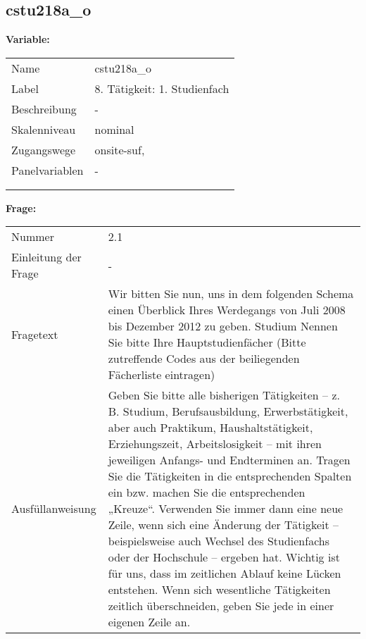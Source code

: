 	
	
	\subsection{cstu218a\_o}
	\label{subSection:cstu218a_o}

	\noindent\textbf{Variable:}\\
		\begin{tabular}{lL{11.3cm}}
			\label{tableVariable:cstu218a_o}
			Name & cstu218a\_o \\
			Label & 8. Tätigkeit: 1. Studienfach \\
			Beschreibung & - \\
			Skalenniveau & nominal \\
			Zugangswege &
				onsite-suf,
 \\
			Panelvariablen & -
			 \\
			 \\
 \\
		\end{tabular}

		\vspace*{1 cm}
		\noindent\textbf{Frage:}\\
		\begin{tabular}{lL{11.3cm}}
			\label{tableQuestion:cstu218a_o}
			Nummer & 2.1 \\
			Einleitung der Frage & - \\
			Fragetext & Wir bitten Sie nun, uns in dem folgenden Schema einen Überblick Ihres Werdegangs von Juli 2008 bis Dezember 2012 zu geben.
Studium
Nennen Sie bitte Ihre Hauptstudienfächer
(Bitte zutreffende Codes aus der beiliegenden Fächerliste eintragen) \\
			Ausfüllanweisung & Geben Sie bitte alle bisherigen Tätigkeiten – z. B. Studium, Berufsausbildung, Erwerbstätigkeit, aber auch Praktikum, Haushaltstätigkeit,
Erziehungszeit, Arbeitslosigkeit – mit ihren jeweiligen Anfangs- und Endterminen an. Tragen Sie die Tätigkeiten in die entsprechenden Spalten ein bzw. machen Sie die entsprechenden „Kreuze“. Verwenden Sie immer dann eine neue Zeile, wenn sich eine Änderung der Tätigkeit – beispielsweise auch Wechsel des Studienfachs oder der Hochschule – ergeben hat. Wichtig ist für uns, dass im zeitlichen Ablauf keine Lücken entstehen. Wenn sich wesentliche Tätigkeiten zeitlich überschneiden, geben Sie jede in einer eigenen Zeile an. \\
		\end{tabular}





